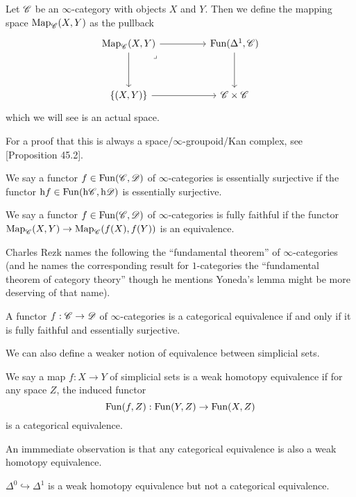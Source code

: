 \documentclass[../../thesis.tex]{subfiles}
\begin{document}
\begin{definition}
    Let $\mathscr{C}$ be an $\infty$-category with objects $X$ and $Y$.
    Then we define the mapping space $\mathrm{Map}_{\mathscr{C}}(X,Y)$ as the pullback
    \[\begin{tikzcd}
            {\map_{\C}(X,Y)} && {\Fun(\Delta^1,\C)} \\
            \\
            {\{(X,Y)\}} && \C\times\C
            \arrow[from=1-1, to=1-3]
            \arrow[from=1-3, to=3-3]
            \arrow[from=3-1, to=3-3]
            \arrow[from=1-1, to=3-1]
            \arrow["\lrcorner"{anchor=center, pos=0.125}, draw=none, from=1-1, to=3-3]
        \end{tikzcd}\]
    which we will see is an actual space.
\end{definition}
For a proof that this is always a space/$\infty$-groupoid/Kan complex, see \cite{Rezk}[Proposition 45.2].
\begin{definition}
    We say a functor $f \in \mathrm{Fun}(\mathscr{C},\mathscr{D})$ of $\infty$-categories is essentially surjective if the functor ${\mathrm{h} f \in \mathrm{Fun}(\mathrm{h}\mathscr{C}, \mathrm{h}\mathscr{D})}$ is essentially surjective.
\end{definition}
\begin{definition}
    We say a functor $f \in \mathrm{Fun}(\mathscr{C},\mathscr{D})$ of $\infty$-categories is fully faithful if the functor ${\mathrm{Map}_{\mathscr{C}}(X,Y) \to \mathrm{Map}_{\mathscr{C}}(f(X),f(Y))}$ is an equivalence.
\end{definition}
Charles Rezk names the following the ``fundamental theorem'' of $\infty$-categories (and he names the corresponding result for $1$-categories the ``fundamental theorem of category theory'' though he mentions Yoneda's lemma might be more deserving of that name).
\begin{theorem}
    A functor $f : \mathscr{C} \to \mathscr{D}$ of $\infty$-categories is a categorical equivalence if and only if it is fully faithful and essentially surjective.
\end{theorem}
We can also define a weaker notion of equivalence between simplicial sets.
\begin{definition}
    We say a map $f: X \to Y$ of simplicial sets is a weak homotopy equivalence if for any space $Z$, the induced functor
    \[
        \mathrm{Fun}(f, Z) : \mathrm{Fun}(Y, Z) \to \mathrm{Fun}(X,Z)
    \]
    is a categorical equivalence.
\end{definition}
An immmediate observation is that any categorical equivalence is also a weak homotopy equivalence.
\begin{example}
    $\Delta^0 \hookrightarrow \Delta^1$ is a weak homotopy equivalence but not a categorical equivalence.
\end{example}
\end{document}
